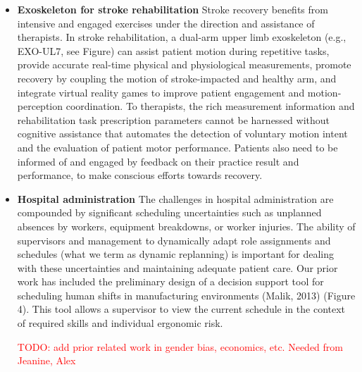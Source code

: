 \begin{itemize}

\item \textbf{Exoskeleton for stroke rehabilitation}
Stroke recovery benefits from intensive and engaged exercises under the direction and assistance of therapists. In stroke rehabilitation, a dual-arm upper limb exoskeleton (e.g., EXO-UL7, see Figure) can assist patient motion during repetitive tasks, provide accurate real-time physical and physiological measurements, promote recovery by coupling the motion of stroke-impacted and healthy arm, and integrate virtual reality games to improve patient engagement and motion-perception coordination. To therapists, the rich measurement information and rehabilitation task prescription parameters cannot be harnessed without cognitive assistance that automates the detection of voluntary motion intent and the evaluation of patient motor performance. Patients also need to be informed of and engaged by feedback on their practice result and performance, to make conscious efforts towards recovery. 

\item \textbf{Hospital administration} The challenges in hospital administration are compounded by significant scheduling uncertainties such as unplanned absences by workers, equipment breakdowns, or worker injuries. The ability of supervisors and management to dynamically adapt role assignments and schedules (what we term as dynamic replanning) is important for dealing with these uncertainties and maintaining adequate patient care. Our prior work has included the preliminary design of a decision support tool for scheduling human shifts in manufacturing environments (Malik, 2013) (Figure 4). This tool allows a supervisor to view the current schedule in the context of required skills and individual ergonomic risk. 

\textcolor{red}{TODO: add prior related work in gender bias, economics, etc.  Needed from Jeanine, Alex}



\end{itemize}